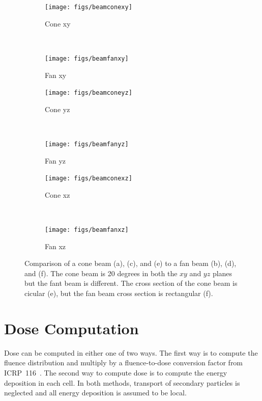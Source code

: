 \begin{figure}
    \centering
    \begin{subfigure}[b]{0.45\textwidth}
        \texttt{[image: figs/beamconexy]}
        \caption{Cone xy}
        \label{fig:beamconexy}
    \end{subfigure}
    ~
    \begin{subfigure}[b]{0.45\textwidth}
        \texttt{[image: figs/beamfanxy]}
        \caption{Fan xy}
        \label{fig:beamfanxy}
    \end{subfigure}

    \begin{subfigure}[b]{0.45\textwidth}
        \texttt{[image: figs/beamconeyz]}
        \caption{Cone yz}
        \label{fig:beamconeyz}
    \end{subfigure}
    ~
    \begin{subfigure}[b]{0.45\textwidth}
        \texttt{[image: figs/beamfanyz]}
        \caption{Fan yz}
        \label{fig:beamfanyz}
    \end{subfigure}
    
    \begin{subfigure}[b]{0.45\textwidth}
        \texttt{[image: figs/beamconexz]}
        \caption{Cone xz}
        \label{fig:beamconexz}
    \end{subfigure}
    ~
    \begin{subfigure}[b]{0.45\textwidth}
        \texttt{[image: figs/beamfanxz]}
        \caption{Fan xz}
        \label{fig:beamfanxz}
    \end{subfigure}
    \caption{Comparison of a cone beam (a), (c), and (e) to a fan beam (b), (d), and (f). The cone beam is 20 degrees in both the $xy$ and $yz$ planes but the fant beam is different. The cross section of the cone beam is cicular (e), but the fan beam cross section is rectangular (f).}\label{fig:beamfancone}
\end{figure}

\section{Dose Computation}
Dose can be computed in either one of two ways. The first way is to compute the fluence distribution and multiply by a fluence-to-dose conversion factor from ICRP~116~\citep{ref:icrp116}. The second way to compute dose is to compute the energy deposition in each cell. In both methods, transport of secondary particles is neglected and all energy deposition is assumed to be local.

